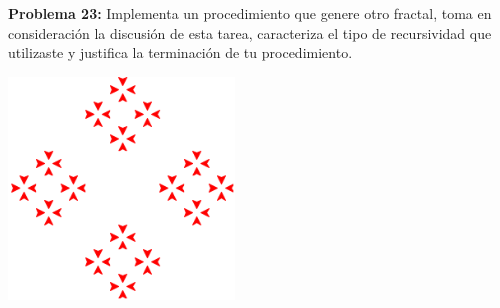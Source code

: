 \documentclass{article}
\begin{document}
\ \\
\\
\textbf{Problema 23:} Implementa un procedimiento que genere otro fractal, toma en consideración la discusión de esta tarea, caracteriza el tipo de recursividad que utilizaste y justifica la terminación de tu procedimiento.
\\
\begin{center}
\includegraphics[width=6cm]{fractal.png}
\end{center}
\end{document}
